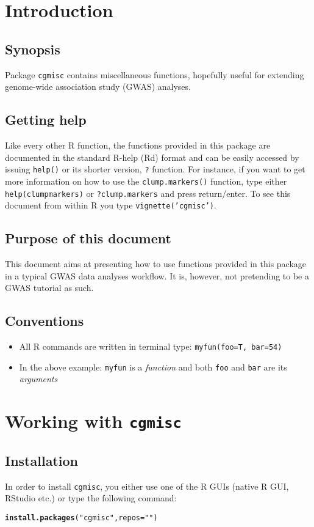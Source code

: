 \documentclass{article}\usepackage{graphicx, color}
\makeatletter
\newcommand{\hlfunctioncall}[1]{\textcolor[rgb]{0.501960784313725,0,0.329411764705882}{\textbf{#1}}}%
\newcommand{\hlstring}[1]{\textcolor[rgb]{0.6,0.6,1}{#1}}%
\newenvironment{kframe}{%
 \def\at@end@of@kframe{}%
 \ifinner\ifhmode%
  \def\at@end@of@kframe{\end{minipage}}%
  \begin{minipage}{\columnwidth}%
 \fi\fi%
 \def\FrameCommand##1{\hskip\@totalleftmargin \hskip-\fboxsep
 \colorbox{shadecolor}{##1}\hskip-\fboxsep
     \hskip-\linewidth \hskip-\@totalleftmargin \hskip\columnwidth}%
 \MakeFramed {\advance\hsize-\width
   \@totalleftmargin\z@ \linewidth\hsize
   \@setminipage}}%
 {\par\unskip\endMakeFramed%
 \at@end@of@kframe}
\newenvironment{knitrout}{}{} %
\makeatother
\begin{document}
\section{Introduction}
\subsection{Synopsis}
Package {\tt cgmisc} contains miscellaneous functions, hopefully useful for extending genome-wide association study (GWAS) analyses. 

\subsection{Getting help}
Like every other R function, the functions provided in this package are documented in the standard R-help (Rd) format and can be easily accessed by issuing {\tt help()} or its shorter version, {\tt ?} function. For instance, if you want to get more information on how to use the {\tt clump.markers()} function, type either {\tt help(clumpmarkers)} or {\tt ?clump.markers} and press return/enter. To see this document from within R you type {\tt vignette('cgmisc')}. 

\subsection{Purpose of this document}
This document aims at presenting how to use functions provided in this package in a typical GWAS data analyses workflow. It is, however, not pretending to be a GWAS tutorial as such.

\subsection{Conventions}
\begin{itemize}
  \item{All R commands are written in terminal type: {\tt myfun(foo=T, bar=54)}}
  \item{In the above example: {\tt myfun} is a \textit{function} and both {\tt foo} and {\tt bar} are its \textit{arguments}}
\end{itemize}

\section{Working with {\tt cgmisc}}
\subsection{Installation}
In order to install {\tt cgmisc}, you either use one of the R GUIs (native R GUI, RStudio etc.) or type the following command:
\begin{knitrout}
\color{fgcolor}\begin{kframe}
\begin{alltt}
\hlfunctioncall{install.packages}(\hlstring{"cgmisc"}, repos = \hlstring{""})
\end{alltt}
\end{kframe}
\end{knitrout}
\end{document}

